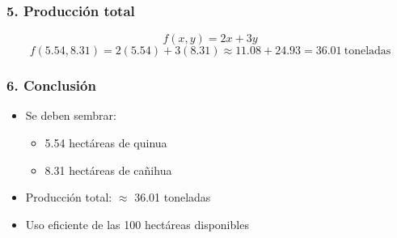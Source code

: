\documentclass{beamer}
\begin{document}
\begin{frame}
\frametitle{5. Producción total}
\[
f(x, y) = 2x + 3y
\]
\[
f(5.54, 8.31) = 2(5.54) + 3(8.31) \approx 11.08 + 24.93 = \boxed{36.01\ \text{toneladas}}
\]
\end{frame}

\begin{frame}
\frametitle{6. Conclusión}
\begin{itemize}
    \item Se deben sembrar:
    \begin{itemize}
        \item 5.54 hectáreas de quinua
        \item 8.31 hectáreas de cañihua
    \end{itemize}
    \item Producción total: $\approx$ 36.01 toneladas
    \item Uso eficiente de las 100 hectáreas disponibles
\end{itemize}
\end{frame}
\end{document}
